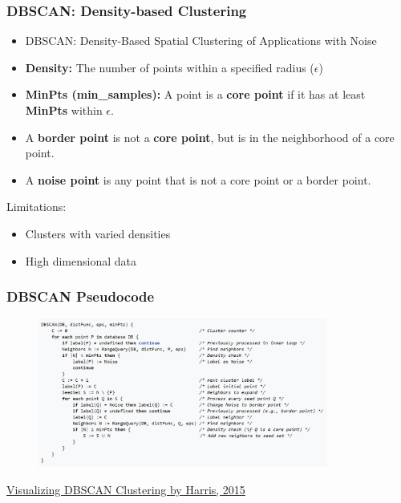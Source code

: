 \documentclass[aspectratio=169, 10pt]{beamer}
\begin{document}
\begin{frame}
    \frametitle{DBSCAN: Density-based Clustering}
    
    \begin{itemize}
        \item DBSCAN: Density-Based Spatial Clustering of Applications with Noise
        \item \textbf{Density:} The number of points within a specified radius ($\epsilon$)
        \item \textbf{MinPts (min\_samples):} A point is a \textbf{core point} if it has at least \textbf{MinPts} within $\epsilon$.
        \item A \textbf{border point} is not a \textbf{core point}, but is in the neighborhood of a core point.
        \item A \textbf{noise point} is any point that is not a core point or a border point.
    \end{itemize}

    Limitations:
    \begin{itemize}
        \item Clusters with varied densities
        \item High dimensional data
    \end{itemize}
    
\end{frame}

\begin{frame}
    \frametitle{DBSCAN Pseudocode}
    
    \begin{figure}
        \centering
        \includegraphics[width=0.85\textwidth]{../imgs/dbscan.png}
    \end{figure}
    
    \begin{example}
        \small
        \href{https://www.naftaliharris.com/blog/visualizing-dbscan-clustering/}{Visualizing DBSCAN Clustering by Harris, 2015}
    \end{example}
\end{frame}
\end{document}
